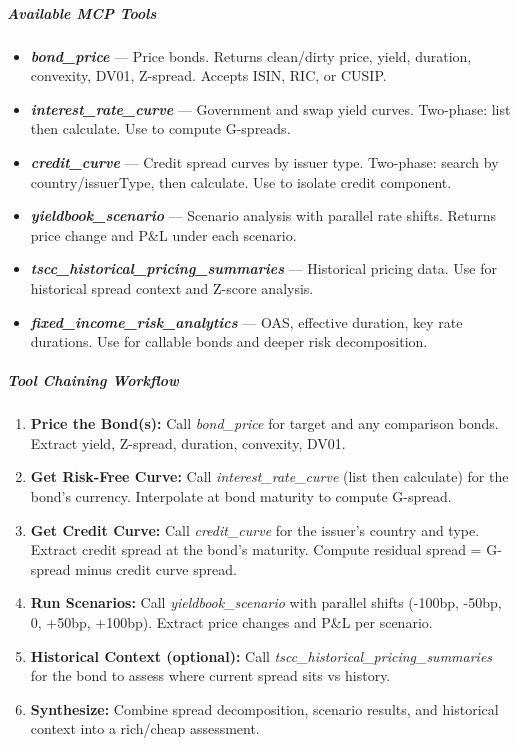 \documentclass[11pt]{article}
\begin{document}
\subparagraph{Available MCP Tools}\mbox{}\par

\begin{itemize}[leftmargin=*,itemsep=2pt,topsep=2pt]
\item {} \textbf{\emph{bond\_\allowbreak{}price}} — Price bonds. Returns clean/dirty price, yield, duration, convexity, DV01, Z-spread. Accepts ISIN, RIC, or CUSIP.
\item {} \textbf{\emph{interest\_\allowbreak{}rate\_\allowbreak{}curve}} — Government and swap yield curves. Two-phase: list then calculate. Use to compute G-spreads.
\item {} \textbf{\emph{credit\_\allowbreak{}curve}} — Credit spread curves by issuer type. Two-phase: search by country/issuerType, then calculate. Use to isolate credit component.
\item {} \textbf{\emph{yieldbook\_\allowbreak{}scenario}} — Scenario analysis with parallel rate shifts. Returns price change and P\&L under each scenario.
\item {} \textbf{\emph{tscc\_\allowbreak{}historical\_\allowbreak{}pricing\_\allowbreak{}summaries}} — Historical pricing data. Use for historical spread context and Z-score analysis.
\item {} \textbf{\emph{fixed\_\allowbreak{}income\_\allowbreak{}risk\_\allowbreak{}analytics}} — OAS, effective duration, key rate durations. Use for callable bonds and deeper risk decomposition.
\end{itemize}

\subparagraph{Tool Chaining Workflow}\mbox{}\par

\begin{enumerate}[leftmargin=*,itemsep=2pt,topsep=2pt]
\item {} \textbf{Price the Bond(s):} Call \emph{bond\_\allowbreak{}price} for target and any comparison bonds. Extract yield, Z-spread, duration, convexity, DV01.
\item {} \textbf{Get Risk-Free Curve:} Call \emph{interest\_\allowbreak{}rate\_\allowbreak{}curve} (list then calculate) for the bond's currency. Interpolate at bond maturity to compute G-spread.
\item {} \textbf{Get Credit Curve:} Call \emph{credit\_\allowbreak{}curve} for the issuer's country and type. Extract credit spread at the bond's maturity. Compute residual spread = G-spread minus credit curve spread.
\item {} \textbf{Run Scenarios:} Call \emph{yieldbook\_\allowbreak{}scenario} with parallel shifts (-100bp, -50bp, 0, +50bp, +100bp). Extract price changes and P\&L per scenario.
\item {} \textbf{Historical Context (optional):} Call \emph{tscc\_\allowbreak{}historical\_\allowbreak{}pricing\_\allowbreak{}summaries} for the bond to assess where current spread sits vs history.
\item {} \textbf{Synthesize:} Combine spread decomposition, scenario results, and historical context into a rich/cheap assessment.
\end{enumerate}
\end{document}
